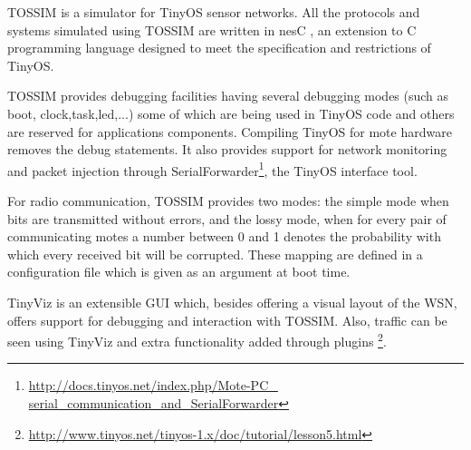 \label{subsec:tossim}
TOSSIM\cite{tossim} is a simulator for TinyOS sensor networks.
All the protocols and systems simulated using TOSSIM are written in nesC \cite{nesC},
an extension to C programming language designed to meet the specification and 
restrictions of TinyOS.
 
TOSSIM provides debugging facilities having several debugging modes 
(such as boot, clock,task,led,...) some of which are being used in TinyOS code
and others are reserved for applications components. Compiling TinyOS for mote
hardware removes the debug statements.
It also provides support for network monitoring and packet injection
through SerialForwarder\footnote{\url{http://docs.tinyos.net/index.php/Mote-PC_
serial_communication_and_SerialForwarder}}, the TinyOS interface tool.

For radio communication, TOSSIM provides two modes: the simple mode when bits
are transmitted without errors, and the lossy mode, when for every pair of communicating
 motes a number between 0 and 1 
denotes the probability with which every received bit will be corrupted. These 
mapping are defined in a configuration file which is given as an argument at boot
time.

TinyViz is an extensible GUI which, besides offering a visual layout of the 
WSN, offers support for debugging and interaction with TOSSIM. Also, traffic can
be seen using TinyViz and extra functionality added through plugins
\footnote{\url{http://www.tinyos.net/tinyos-1.x/doc/tutorial/lesson5.html}}.

